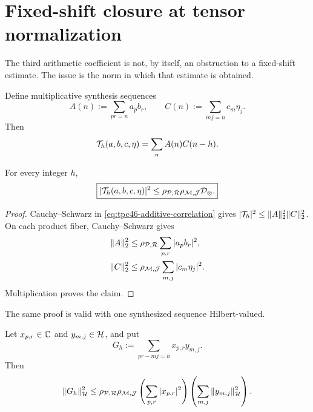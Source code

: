 \section{Fixed-shift closure at tensor normalization}
\label{sec:tpc46-tensor-closure}

The third arithmetic coefficient is not, by itself, an obstruction to
a fixed-shift estimate.  The issue is the norm in which that estimate
is obtained.

Define multiplicative synthesis sequences
\begin{equation}
 A(n):=\sum_{pr=n}a_pb_r,
 \qquad
 C(n):=\sum_{mj=n}c_m\eta_j.
 \label{eq:tpc46-product-synthesis}
\end{equation}
Then
\begin{equation}
 \mathcal T_h(a,b,c,\eta)=\sum_nA(n)C(n-h).
 \label{eq:tpc46-additive-correlation}
\end{equation}

\begin{theorem}
\label{thm:tpc46-scalar-tensor-closure}
For every integer \(h\),
\begin{equation}
 \boxed{
 |\mathcal T_h(a,b,c,\eta)|^2
 \le
 \rho_{\mathcal P,\mathcal R}\rho_{\mathcal M,\mathcal J}\mathcal D_\otimes.}
 \label{eq:tpc46-scalar-tensor-bound}
\end{equation}
\end{theorem}

\begin{proof}
Cauchy--Schwarz in \eqref{eq:tpc46-additive-correlation} gives
\(
 |\mathcal T_h|^2\le\|A\|_2^2\|C\|_2^2
\).
On each product fiber, Cauchy--Schwarz gives
\begin{align*}
 \|A\|_2^2
 &\le\rho_{\mathcal P,\mathcal R}\sum_{p,r}|a_pb_r|^2,\\
 \|C\|_2^2
 &\le\rho_{\mathcal M,\mathcal J}\sum_{m,j}|c_m\eta_j|^2.
\end{align*}
Multiplication proves the claim.
\end{proof}

The same proof is valid with one synthesized sequence Hilbert-valued.

\begin{corollary}
\label{cor:tpc46-one-vector-slot}
Let \(x_{p,r}\in\mathbb C\) and \(y_{m,j}\in\mathcal H\), and put
\[
 G_h:=\sum_{pr-mj=h}x_{p,r}y_{m,j}.
\]
Then
\begin{equation}
 \|G_h\|_{\mathcal H}^2
 \le
 \rho_{\mathcal P,\mathcal R}\rho_{\mathcal M,\mathcal J}
 \left(\sum_{p,r}|x_{p,r}|^2\right)
 \left(\sum_{m,j}\|y_{m,j}\|_{\mathcal H}^2\right).
 \label{eq:tpc46-one-vector-bound}
\end{equation}
\end{corollary}

